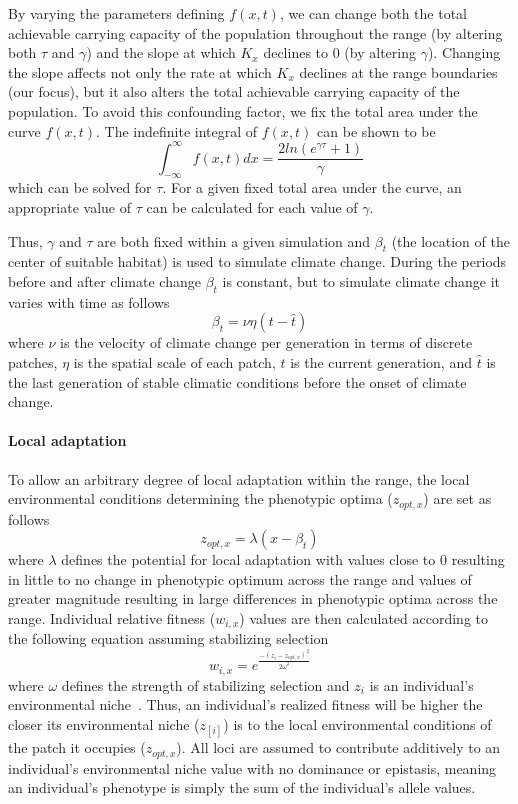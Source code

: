 \documentclass[11pt, oneside]{article}
\begin{document}
By varying the parameters defining $f(x,t)$, we can change both the total achievable carrying capacity of the population throughout the range (by altering both $\tau$ and $\gamma$) and the slope at which $K_{x}$ declines to $0$ (by altering $\gamma$). Changing the slope affects not only the rate at which $K_{x}$ declines at the range boundaries (our focus), but it also alters the total achievable carrying capacity of the population. To avoid this confounding factor, we fix the total area under the curve $f(x,t)$. The indefinite integral of $f(x,t)$ can be shown to be
\begin{equation}
\int_{-\infty}^{\infty}f(x,t)dx = \frac{2ln(e^{\gamma\tau}+1)}{\gamma}
\end{equation}
which can be solved for $\tau$. For a given fixed total area under the curve, an appropriate value of $\tau$ can be calculated for each value of $\gamma$.

Thus, $\gamma$ and $\tau$ are both fixed within a given simulation and $\beta_{t}$ (the location of the center of suitable habitat) is used to simulate climate change. During the periods before and after climate change $\beta_{t}$ is constant, but to simulate climate change it varies with time as follows
\begin{equation}
\beta_{t}=\nu\eta(t-\hat{t})
\end{equation}
where $\nu$ is the velocity of climate change per generation in terms of discrete patches, $\eta$ is the spatial scale of each patch, $t$ is the current generation, and $\hat{t}$ is the last generation of stable climatic conditions before the onset of climate change.

\paragraph{Local adaptation}
To allow an arbitrary degree of local adaptation within the range, the local environmental conditions determining the phenotypic optima ($z_{opt,x}$) are set as follows
\begin{equation}
z_{opt,x}=\lambda(x-\beta_{t})
\end{equation}
where $\lambda$ defines the potential for local adaptation with values close to $0$ resulting in little to no change in phenotypic optimum across the range and values of greater magnitude resulting in large differences in phenotypic optima across the range. Individual relative fitness ($w_{i,x}$) values are then calculated according to the following equation assuming stabilizing selection
\begin{equation}
w_{i,x}=e^{\frac{-(z_{i}-z_{opt,x})^{2}}{2\omega^{2}}}
\end{equation}
where $\omega$ defines the strength of stabilizing selection and $z_{i}$ is an individual's environmental niche~\citep{lande1976natural}. Thus, an individual's realized fitness will be higher the closer its environmental niche ($z_[i]$) is to the local environmental conditions of the patch it occupies ($z_{opt,x}$). All loci are assumed to contribute additively to an individual's environmental niche value with no dominance or epistasis, meaning an individual's phenotype is simply the sum of the individual's allele values.
\end{document}
